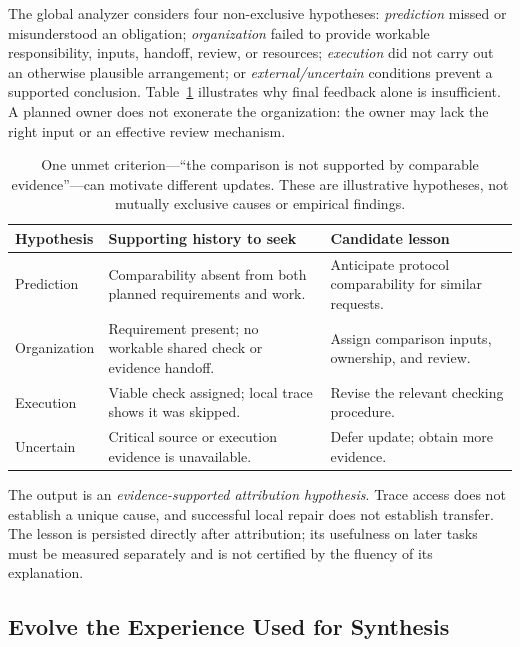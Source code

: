 \documentclass[11pt]{article}
\begin{document}
The global analyzer considers four non-exclusive hypotheses: \emph{prediction} missed or misunderstood an obligation; \emph{organization} failed to provide workable responsibility, inputs, handoff, review, or resources; \emph{execution} did not carry out an otherwise plausible arrangement; or \emph{external/uncertain} conditions prevent a supported conclusion. Table~\ref{tab:example} illustrates why final feedback alone is insufficient. A planned owner does not exonerate the organization: the owner may lack the right input or an effective review mechanism.

\begin{table}[t]
\small\centering
\begin{tabularx}{\columnwidth}{@{}>{\raggedright\arraybackslash}p{1.65cm}>{\raggedright\arraybackslash}X>{\raggedright\arraybackslash}X@{}}
\toprule
Hypothesis & Supporting history to seek & Candidate lesson \\
\midrule
Prediction & Comparability absent from both planned requirements and work. & Anticipate protocol comparability for similar requests. \\
Organization & Requirement present; no workable shared check or evidence handoff. & Assign comparison inputs, ownership, and review. \\
Execution & Viable check assigned; local trace shows it was skipped. & Revise the relevant checking procedure. \\
Uncertain & Critical source or execution evidence is unavailable. & Defer update; obtain more evidence. \\
\bottomrule
\end{tabularx}
\caption{One unmet criterion---``the comparison is not supported by comparable evidence''---can motivate different updates. These are illustrative hypotheses, not mutually exclusive causes or empirical findings.}
\label{tab:example}
\end{table}

The output is an \emph{evidence-supported attribution hypothesis}. Trace access does not establish a unique cause, and successful local repair does not establish transfer. The lesson is persisted directly after attribution; its usefulness on later tasks must be measured separately and is not certified by the fluency of its explanation.

\subsection{Evolve the Experience Used for Synthesis}
\label{sec:update}
\end{document}
